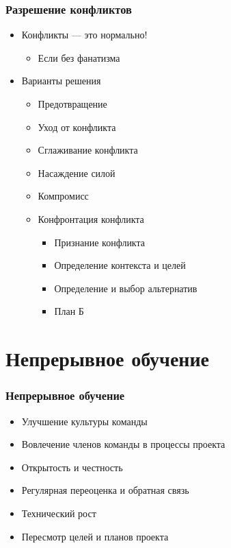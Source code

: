 \documentclass{../../slides-style}
\begin{document}
    \begin{frame}
        \frametitle{Разрешение конфликтов}
        \begin{itemize}
            \item Конфликты --- это нормально!
            \begin{itemize}
                \item Если без фанатизма
            \end{itemize}
            \item Варианты решения
            \begin{itemize}
                \item Предотвращение
                \item Уход от конфликта
                \item Сглаживание конфликта
                \item Насаждение силой
                \item Компромисс
                \item Конфронтация конфликта
                \begin{itemize}
                    \item Признание конфликта
                    \item Определение контекста и целей
                    \item Определение и выбор альтернатив
                    \item План Б
                \end{itemize}
            \end{itemize}
        \end{itemize}
    \end{frame}

    \section{Непрерывное обучение}

    \begin{frame}
        \frametitle{Непрерывное обучение}
        \begin{itemize}
            \item Улучшение культуры команды
            \item Вовлечение членов команды в процессы проекта
            \item Открытость и честность
            \item Регулярная переоценка и обратная связь
            \item Технический рост
            \item Пересмотр целей и планов проекта
        \end{itemize}
    \end{frame}
\end{document}
